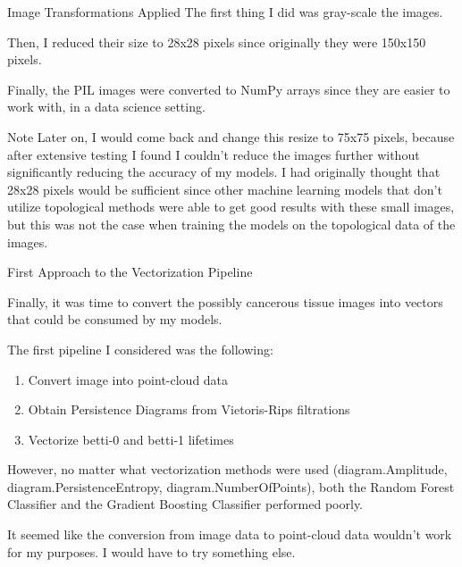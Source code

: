 \documentclass[11pt]{beamer}
\begin{document}
\begin{frame}{Image Transformations Applied}
    The first thing I did was gray-scale the images.
    
    \vspace{3mm}
    
    Then, I reduced their size to 28x28 pixels since originally they were 150x150 pixels.
    
    \vspace{3mm}

    Finally, the PIL images were converted to NumPy arrays since they are easier to work with, in a data science setting.
    
    \vspace{3mm}
    
    \begin{block}{Note}
        Later on, I would come back and change this resize to 75x75 pixels, because after extensive testing I found I couldn't reduce the images further without significantly reducing the accuracy of my models. I had originally thought that 28x28 pixels would be sufficient since other machine learning models that don't utilize topological methods were able to get good results with these small images, but this was not the case when training the models on the topological data of the images.
    \end{block}
    
\end{frame}

\begin{frame}{First Approach to the Vectorization Pipeline}
    \par Finally, it was time to convert the possibly cancerous tissue images into vectors that could be consumed by my models.
    
    \vspace{3mm}
    
    \par The first pipeline I considered was the following:
    
    \begin{enumerate}
        \item Convert image into point-cloud data
        \item Obtain Persistence Diagrams from Vietoris-Rips filtrations
        \item Vectorize betti-0 and betti-1 lifetimes
    \end{enumerate}
    
    \vspace{3mm}
    
    \par However, no matter what vectorization methods were used (diagram.Amplitude, diagram.PersistenceEntropy, diagram.NumberOfPoints), both the Random Forest Classifier and the Gradient Boosting Classifier performed poorly.
    
    \vspace{3mm}
    
    \par It seemed like the conversion from image data to point-cloud data wouldn't work for my purposes. I would have to try something else.
\end{frame}
\end{document}

